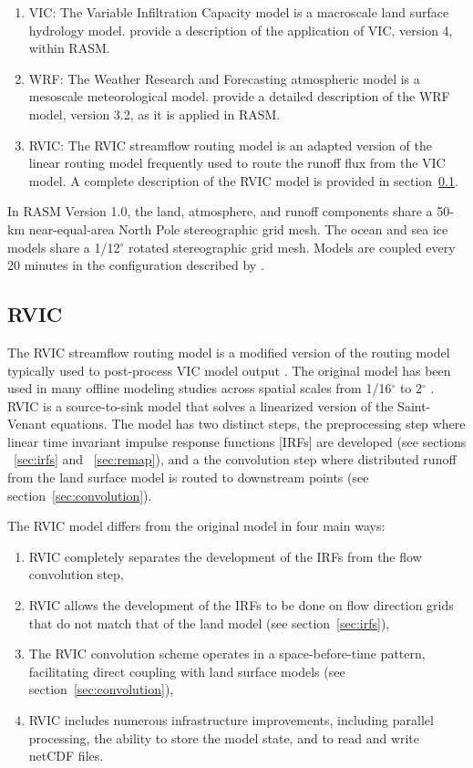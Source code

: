 \documentclass[jgrga, draft]{agutex}
\begin{document}
\begin{article}
\begin{enumerate}
\item VIC: The Variable Infiltration Capacity model \citep{Liang_1996} is a macroscale land surface hydrology model.
\citet{Hamman_2016} provide a description of the application of VIC, version 4, within RASM.
\item WRF: The Weather Research and Forecasting atmospheric model \citep{Skamarock_2007} is a mesoscale meteorological model.
\citet{Cassano_2015} provide a detailed description of the WRF model, version 3.2, as it is applied in RASM.
\item RVIC: The RVIC streamflow routing model is an adapted version of the \citet{Lohmann_1996} linear routing model frequently used to route the runoff flux from the VIC model.
A complete description of the RVIC model is provided in section~\ref{sec:rvic}.
\end{enumerate}

In RASM Version 1.0, the land, atmosphere, and runoff components share a 50-km near-equal-area North Pole stereographic grid mesh.
The ocean and sea ice models share a 1/12$^{\circ}$ rotated stereographic grid mesh.
Models are coupled every 20 minutes in the configuration described by \citet{Roberts_2015a}.

\subsection{RVIC}
\label{sec:rvic}

The RVIC streamflow routing model is a modified version of the routing model typically used to post-process VIC model output \citep{Lohmann_1996, Lohmann_1998a}.
The original \citet{Lohmann_1996} model has been used in many offline modeling studies across spatial scales from 1/16$^{\circ}$ to 2$^{\circ}$ \citep[e.g.][]{Nijssen_1997,Lohmann_1998b,Su_2005}.
RVIC is a source-to-sink model that solves a linearized version of the Saint-Venant equations.
The model has two distinct steps, the preprocessing step where linear time invariant impulse response functions [IRFs] are developed (see sections ~\ref{sec:irfs} and ~\ref{sec:remap}), and a the convolution step where distributed runoff from the land surface model is routed to downstream points (see section~\ref{sec:convolution}).

The RVIC model differs from the original \citet{Lohmann_1996} model in four main ways:

\begin{enumerate}
\item RVIC completely separates the development of the IRFs from the flow convolution step,
\item RVIC allows the development of the IRFs to be done on flow direction grids that do not match that of the land model (see section~\ref{sec:irfs}),
\item The RVIC convolution scheme operates in a space-before-time pattern, facilitating direct coupling with land surface models (see section~\ref{sec:convolution}),
\item RVIC includes numerous infrastructure improvements, including parallel processing, the ability to store the model state, and to read and write netCDF files.
\end{enumerate}


\end{article}
\end{document}
